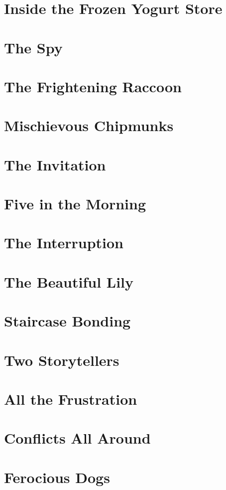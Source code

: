 \documentclass[smalldemyvopaper,11pt,twoside,onecolumn,openright,extrafontsizes]{memoir}
\begin{document}
\chapter{Inside the Frozen Yogurt Store}

\chapter{The Spy}

\chapter{The Frightening Raccoon}

\chapter{Mischievous Chipmunks}

\chapter{The Invitation}

\chapter{Five in the Morning}

\chapter{The Interruption}

\chapter{The Beautiful Lily}

\chapter{Staircase Bonding}

\chapter{Two Storytellers}

\chapter{All the Frustration}

\chapter{Conflicts All Around}

\chapter{Ferocious Dogs}

\end{document}
